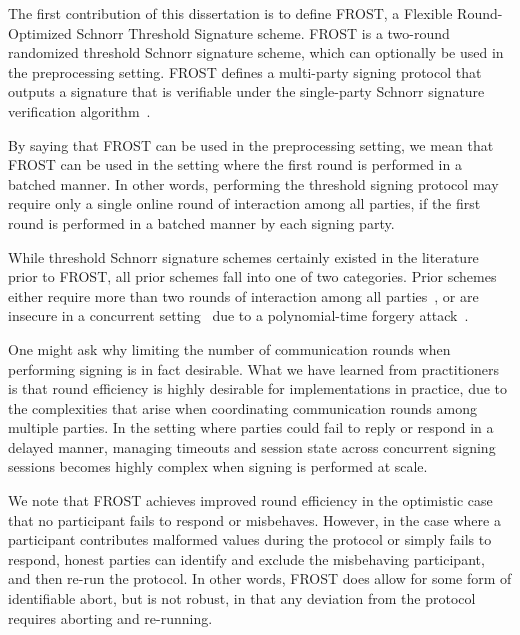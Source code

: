 The first contribution of this dissertation is to define FROST,
a Flexible Round-Optimized Schnorr Threshold Signature scheme.
FROST is a two-round randomized threshold Schnorr signature scheme,
which can optionally be used in the preprocessing setting.
FROST defines a multi-party signing protocol that outputs a signature that is
verifiable under the single-party Schnorr signature verification algorithm~\cite{Schnorr91}.

By saying that FROST can be used in the preprocessing setting,
we mean that FROST can be used in the setting where the first round is performed in a batched manner.
In other words,
performing the threshold signing protocol may require only a single online round of interaction among all parties,
if the first round is performed in a batched manner by each signing party.

While threshold Schnorr signature schemes certainly existed in the literature prior to FROST,
all prior schemes fall into one of two categories.
Prior schemes either require more than two rounds of interaction among all parties~\cite{StinsonR01},
or are insecure in a concurrent setting~\cite{GennaroJKR03}
due to a polynomial-time forgery attack~\cite{DrijversEFKLNS19,BenhamoudaLLOR20}.

One might ask why limiting the number of communication rounds when performing signing is in fact desirable.
What we have learned from practitioners is that round efficiency is highly desirable for implementations in practice,
due to the complexities that arise when coordinating communication rounds among multiple parties.
In the setting where parties could fail to reply or respond in a delayed manner,
managing timeouts and session state across concurrent signing sessions becomes highly complex when signing is performed at scale.

We note that FROST achieves improved round efficiency in the optimistic case that no participant fails to respond or misbehaves.
However, in the case where a participant contributes malformed
values during the protocol or simply fails to respond,
honest parties can identify and exclude the misbehaving participant, and then re-run the protocol.
In other words,
FROST does allow for some form of identifiable abort,
but is not robust,
in that any deviation from the protocol requires aborting and re-running.

